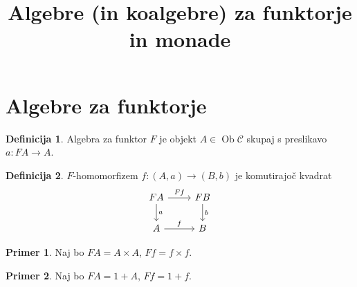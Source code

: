 \documentclass[12pt]{article}
\title{Algebre (in koalgebre) za funktorje in monade}
\theoremstyle{definition}
\newtheorem{definition}{Definicija}
\newtheorem*{example}{Primer}
\theoremstyle{remark}
\newcommand{\C}{\mathcal{C}}
\DeclareMathOperator{\ob}{Ob}
\begin{document}
\section{Algebre za funktorje}

\begin{definition}
    Algebra za funktor \(F\) je objekt \( A \in \ob\C \) skupaj s preslikavo \( a : FA \to A \).
\end{definition}
\begin{definition}
    \(F\)-homomorfizem \( f : (A, a) \to (B, b) \) je komutirajoč kvadrat
    \[\begin{tikzcd}
        FA & FB\\
         A &  B
        \arrow["Ff", from=1-1, to=1-2]
        \arrow["a",  from=1-1, to=2-1]
        \arrow["b",  from=1-2, to=2-2]
        \arrow["f",  from=2-1, to=2-2]
    \end{tikzcd}\]
\end{definition}

\begin{example}
    Naj bo \( FA = A \times A \), \( Ff = f \times f \).
\end{example}
\begin{example}
    Naj bo \( FA = 1 + A \), \( Ff = 1 + f \).
\end{example}
\end{document}
